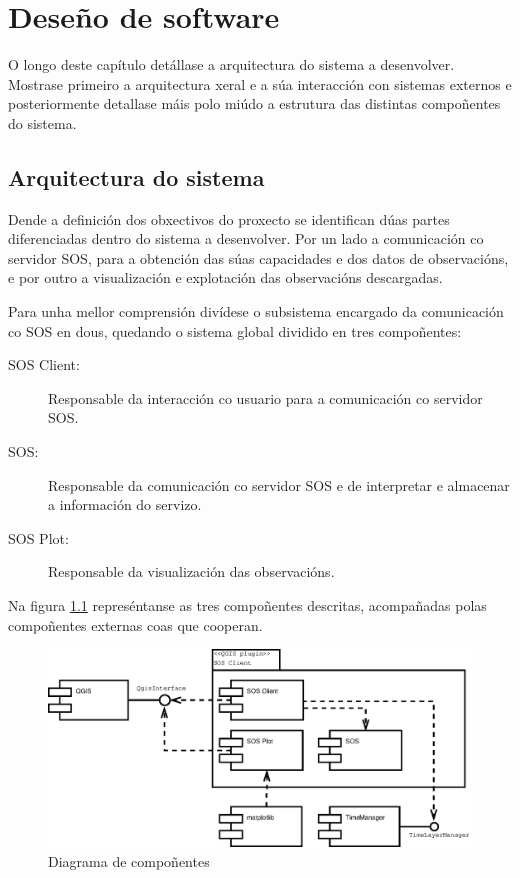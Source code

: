 \chapter{Deseño de software}
O longo deste capítulo detállase a arquitectura do sistema a desenvolver. Mostrase primeiro a arquitectura xeral e a súa interacción con sistemas externos e posteriormente detallase máis polo miúdo a estrutura das distintas compoñentes do sistema.

\section{Arquitectura do sistema}
Dende a definición dos obxectivos do proxecto se identifican dúas partes diferenciadas dentro do sistema a desenvolver. Por un lado a comunicación co servidor SOS, para a obtención das súas capacidades e dos datos de observacións, e por outro a visualización e explotación das observacións descargadas.

Para unha mellor comprensión divídese o subsistema encargado da comunicación co SOS en dous, quedando o sistema global dividido en tres compoñentes:
\begin{description}
\item[SOS Client:] Responsable da interacción co usuario para a comunicación co servidor SOS.
\item[SOS:] Responsable da comunicación co servidor SOS e de interpretar e almacenar a información do servizo.
\item[SOS Plot:] Responsable da visualización das observacións.
\end{description}

Na figura \ref{fig:diaComponentes} represéntanse as tres compoñentes descritas, acompañadas polas compoñentes externas coas que cooperan.

\begin{figure}[hbtp]
 \centering
 \includegraphics[width=\textwidth]{images/componentes.eps}
 \caption{Diagrama de compoñentes}
 \label{fig:diaComponentes}
\end{figure}

